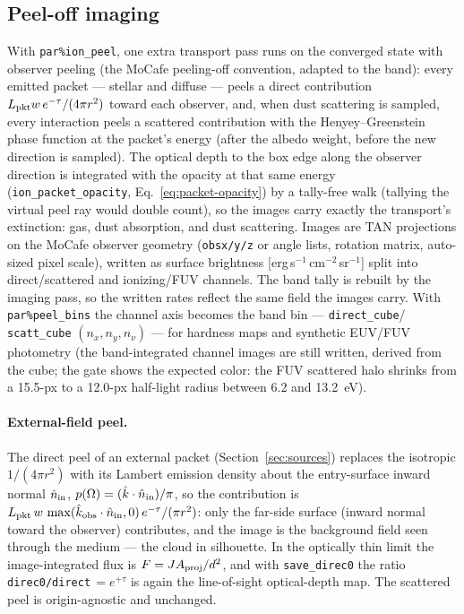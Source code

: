 \documentclass[english,a4paper]{my_memo}
\newcommand{\code}[1]{\texttt{#1}}
\begin{document}
\subsection{Peel-off imaging}
\label{sec:peel}
With \code{par\%ion\_peel}, one extra transport pass runs on the
converged state with observer peeling (the MoCafe peeling-off
convention, adapted to the band): every emitted packet --- stellar and
diffuse --- peels a direct contribution
$L_{\rm pkt}w\,e^{-\tau}/(4\pi r^2)$ toward each observer, and, when
dust scattering is sampled, every interaction peels a scattered
contribution with the Henyey--Greenstein phase function at the
packet's energy (after the albedo weight, before the new direction is
sampled).  The optical depth to the box edge along the observer
direction is integrated with the opacity at that same energy
(\code{ion\_packet\_opacity}, Eq.~\ref{eq:packet-opacity}) by
a tally-free walk (tallying the virtual peel ray would double count),
so the images carry exactly the transport's extinction: gas, dust
absorption, and dust scattering.  Images are TAN projections on the
MoCafe observer geometry (\code{obsx/y/z} or angle lists, rotation
matrix, auto-sized pixel scale), written as surface brightness
[erg\,s$^{-1}$\,cm$^{-2}$\,sr$^{-1}$] split into direct/scattered and
ionizing/FUV channels.  The band tally is rebuilt by the imaging pass,
so the written rates reflect the same field the images carry.  With \code{par\%peel\_bins} the
channel axis becomes the band bin --- \code{direct\_cube}/
\code{scatt\_cube} $(n_x, n_y, n_\nu)$ --- for hardness maps and
synthetic EUV/FUV photometry (the band-integrated channel images are
still written, derived from the cube; the gate shows the expected
color: the FUV scattered halo shrinks from a 15.5-px to a 12.0-px
half-light radius between 6.2 and 13.2~eV).

\paragraph{External-field peel.}  The direct peel of an external
packet (Section~\ref{sec:sources}) replaces the isotropic
$1/(4\pi r^2)$ with its Lambert emission density about the
entry-surface inward normal $\hat n_{\rm in}$,
$p(\Omega) = (\hat k \cdot \hat n_{\rm in})/\pi$, so the contribution
is $L_{\rm pkt}\,w\,\max(\hat k_{\rm obs}\cdot\hat n_{\rm in}, 0)\,
e^{-\tau}/(\pi r^2)$: only the far-side surface (inward normal toward
the observer) contributes, and the image is the background field seen
through the medium --- the cloud in silhouette.  In the optically thin
limit the image-integrated flux is $F = J A_{\rm proj}/d^2$, and with
\code{save\_direc0} the ratio \code{direc0/direct}$\,= e^{+\tau}$ is
again the line-of-sight optical-depth map.  The scattered peel is
origin-agnostic and unchanged.
\end{document}
